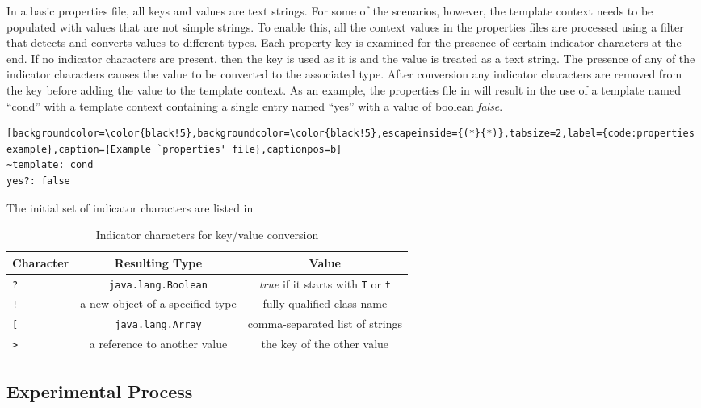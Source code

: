 In a basic properties file, all keys and values are text strings. For some of the scenarios, however, the template context needs to be populated with values that are not simple strings. To enable this, all the context values in the properties files are processed using a filter that detects and converts values to different types. Each property key is examined for the presence of certain indicator characters at the end. If no indicator characters are present, then the key is used as it is and the value is treated as a text string. The presence of any of the indicator characters causes the value to be converted to the associated type. After conversion any indicator characters are removed from the key before adding the value to the template context. As an example, the properties file in  will result in the use of a template named \enquote{cond} with a template context containing a single entry named \enquote{yes} with a value of boolean \emph{false}.

\begin{lstlisting}[backgroundcolor=\color{black!5},backgroundcolor=\color{black!5},escapeinside={(*}{*)},tabsize=2,label={code:properties example},caption={Example `properties' file},captionpos=b]
~template: cond
yes?: false
\end{lstlisting}

The initial set of indicator characters are listed in 

\begin{table}[ht!]
\centering
\begin{tabular}{lcc}
\textbf{Character} & \textbf{Resulting Type}  & \textbf{Value} \\
\hline
\verb!?!   & \verb!java.lang.Boolean! & \emph{true} if it starts with \verb!T! or \verb!t! \\
\verb|!|   & a new object of a specified type & fully qualified class name \\
\verb![!   & \verb!java.lang.Array! & comma-separated list of strings \\
\verb!>!   & a reference to another value & the key of the other value \\
\end{tabular}
\caption{Indicator characters for key/value conversion\label{table:indicator characters}}
\end{table}


\subsection{Experimental Process}
\label{comp:experimental process}

